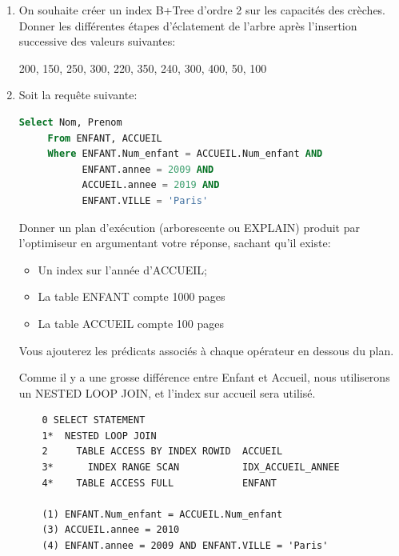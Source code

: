 \begin{enumerate}
  \item On souhaite cr\'eer un index B+Tree d'ordre 2 sur les
  capacit\'es des cr\`eches. Donner les diff\'erentes \'etapes d'\'eclatement de l'arbre apr\`es l'insertion successive des valeurs suivantes:
  \begin{center}
  200, 150, 250, 300, 220, 350, 240, 300, 400, 50, 100
  \end{center}
\begin{correction}
  \begin{figure}[htbp]
  \centering
  \end{figure}
\end{correction}
 
  \item Soit la requ\^ete suivante:
      \begin{lstlisting}[language=SQL]
     Select Nom, Prenom 
     From ENFANT, ACCUEIL
     Where ENFANT.Num_enfant = ACCUEIL.Num_enfant AND
           ENFANT.annee = 2009 AND
           ACCUEIL.annee = 2019 AND
           ENFANT.VILLE = 'Paris'
     \end{lstlisting}
     Donner un plan d'ex\'ecution (arborescente ou EXPLAIN) produit par l'optimiseur 
     en argumentant votre r\'eponse, sachant qu'il existe:
     \begin{itemize}
       \item Un index sur l'ann\'ee d'ACCUEIL;
       \item La table ENFANT compte 1000 pages 
       \item La table ACCUEIL compte 100 pages
     \end{itemize}
     Vous ajouterez les pr\'edicats associ\'es \`a chaque op\'erateur en dessous du
     plan.
\begin{correction}
     Comme il y a une grosse diff\'erence entre Enfant et Accueil, nous utiliserons un NESTED LOOP JOIN, et l'index sur accueil sera utilis\'e.
    \begin{verbatim}
    0 SELECT STATEMENT
    1*  NESTED LOOP JOIN
    2     TABLE ACCESS BY INDEX ROWID  ACCUEIL
    3*      INDEX RANGE SCAN           IDX_ACCUEIL_ANNEE
    4*    TABLE ACCESS FULL            ENFANT
 
    (1) ENFANT.Num_enfant = ACCUEIL.Num_enfant
    (3) ACCUEIL.annee = 2010
    (4) ENFANT.annee = 2009 AND ENFANT.VILLE = 'Paris'
    \end{verbatim}
\end{correction}


\end{enumerate}
